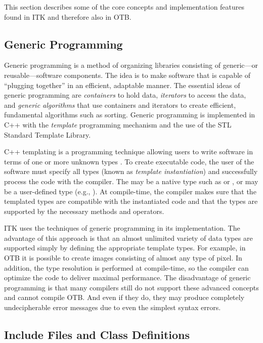 This section describes some of the core concepts and implementation features
found in ITK and therefore also in OTB.

\subsection{Generic Programming}
\label{sec:GenericProgramming}


Generic programming is a method of organizing libraries consisting of
generic---or reusable---software components. The idea is to
make software that is capable of ``plugging together'' in an efficient,
adaptable manner. The essential ideas of generic programming are
\emph{containers} to hold data, \emph{iterators} to access the data, and 
\emph{generic algorithms} that use containers and iterators to create 
efficient, fundamental algorithms such as sorting. Generic programming is
implemented in C++ with the \emph{template} programming mechanism and the 
use of the STL Standard Template Library.

C++ templating is a programming technique allowing users to write software in
terms of one or more unknown types . To create executable code, the
user of the software must specify all types  (known as \emph{template
instantiation}) and successfully process the code with the compiler. The
 may be a native type such as
 or , or  may be a user-defined type (e.g.,
). At compile-time, the compiler makes sure that the templated 
types are compatible with the instantiated code and that the types are
supported by the necessary methods and operators.

ITK uses the techniques of generic programming in its implementation. The
advantage of this approach is that an almost unlimited variety of data types
are supported simply by defining the appropriate template types. For example,
in OTB it is possible to create images consisting of almost any type of
pixel. In addition, the type resolution is performed at compile-time, so the
compiler can optimize the code to deliver maximal performance. The
disadvantage of generic programming is that many compilers still do not
support these advanced concepts and cannot compile OTB. And even if they do,
they may produce completely undecipherable error messages due to even the
simplest syntax errors.

\subsection{Include Files and Class Definitions}
\label{sec:IncludeFiles}

